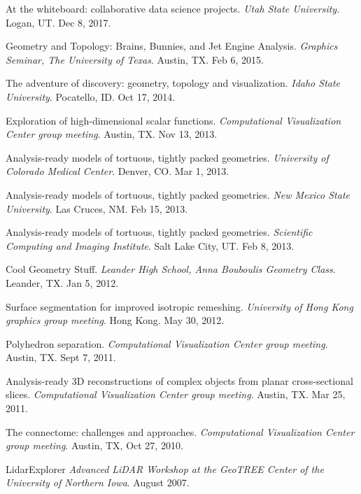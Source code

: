 \documentclass[margin,line]{res}
\begin{document}
\begin{resume}
\begin{LONG}
At the whiteboard: collaborative data science projects.
\textit{Utah State University}. Logan, UT. Dec 8, 2017.

Geometry and Topology: Brains, Bunnies, and Jet Engine Analysis.
\textit{Graphics Seminar, The University of Texas}. Austin, TX. Feb 6, 2015.

The adventure of discovery: geometry, topology and visualization.
\textit{Idaho State University}. Pocatello, ID. Oct 17, 2014.

Exploration of high-dimensional scalar functions.
\textit{Computational Visualization Center group meeting}. Austin, TX. Nov 13, 2013.

Analysis-ready models of tortuous, tightly packed geometries.
\textit{University of Colorado Medical Center}. Denver, CO. Mar 1, 2013.

Analysis-ready models of tortuous, tightly packed geometries.
\textit{New Mexico State University}. Las Cruces, NM. Feb 15, 2013.

Analysis-ready models of tortuous, tightly packed geometries.
\textit{Scientific Computing and Imaging Institute}. Salt Lake City,
UT. Feb 8, 2013.

Cool Geometry Stuff.
\textit{Leander High School, Anna Bouboulis Geometry Class}. Leander, TX. Jan 5, 2012.

Surface segmentation for improved isotropic remeshing.
\textit{University of Hong Kong graphics group meeting}. Hong Kong. May 30, 2012.

Polyhedron separation.
\textit{Computational Visualization Center group meeting}. Austin, TX. Sept 7, 2011.

Analysis-ready 3D reconstructions of complex objects from planar cross-sectional slices.
\textit{Computational Visualization Center group meeting}. Austin, TX. Mar 25, 2011.

The connectome: challenges and approaches.
\textit{Computational Visualization Center group meeting}. Austin, TX, Oct 27, 2010.

LidarExplorer
\textit{Advanced LiDAR Workshop at the GeoTREE Center of the University of Northern Iowa}. August 2007.

%
%


\end{LONG}
\end{resume}
\end{document}
